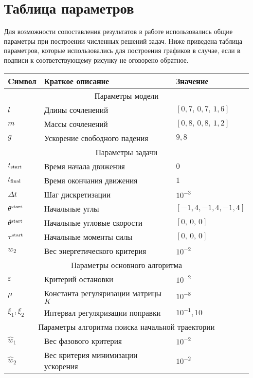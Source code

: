 \documentclass[../../doc.tex]{subfiles}
\begin{document}
    \section{Таблица параметров}

    Для возможности сопоставления результатов в работе использовались общие параметры при построении численных решений задач.
    Ниже приведена таблица параметров, которые использовались для построения графиков в случае, если в подписи к соответствующему рисунку не оговорено обратное.

    \begin{flushleft}
    \begin{tabular}{|p{2cm}|p{9cm}|p{4cm}|}
        \hline
        Cимвол & Краткое описание & Значение \\
        \hline\hline
        \multicolumn{3}{|c|}{Параметры модели} \\
        \hline\hline
        $l$ & Длины сочленений & $[0,\!7,\, 0,\!7,\, 1,\!6]$
        \\
        \hline
        $m$ & Массы сочленений & $[0,\!8,\, 0,\!8,\, 1,\!2]$
        \\
        \hline
        $g$ & Ускорение свободного падения & $9,\!8$
        \\
        \hline
        \hline
        \multicolumn{3}{|c|}{Параметры задачи} \\
        \hline\hline
        $t_{\textnormal{start}}$ & Время начала движения & $0$
        \\ \hline
        $t_{\textnormal{final}}$ & Время окончания движения & $1$
        \\ \hline
        $\Delta t$ & Шаг дискретизации & $10^{-3}$
        \\ \hline
        $\theta^{\textnormal{start}}$ & Начальные углы & $[-1,\!4, -1,\!4, -1,\!4]$
        \\ \hline
        $\dot \theta^{\textnormal{start}}$ & Начальные угловые скорости & $[0,\, 0,\, 0]$
        \\ \hline
        $\tau^{\textnormal{start}}$ & Начальные моменты силы & $[0,\, 0,\, 0]$
        \\ \hline
        $w_2$ & Вес энергетического критерия & $10^{-2}$
        \\ \hline\hline
        \multicolumn{3}{|c|}{Параметры основного алгоритма}
        \\\hline\hline
        $\varepsilon$ & Критерий остановки & $10^{-2}$
        \\ \hline
        $\mu$ & Константа регуляризации матрицы $K$ & $10^{-8}$
        \\ \hline
        $\xi_1, \xi_2$ & Интервал регуляризации поправки & $10^{-1}, 10$
        \\ \hline\hline
        \multicolumn{3}{|c|}{Параметры алгоритма поиска начальной траектории}
        \\ \hline\hline
        $\hat w_1$ & Вес фазового критерия & $10^{-2}$
        \\ \hline
        $\hat w_2$ & Вес критерия минимизации ускорения & $10^{-2}$
        \\ \hline
    \end{tabular}
    \end{flushleft}
\end{document}

